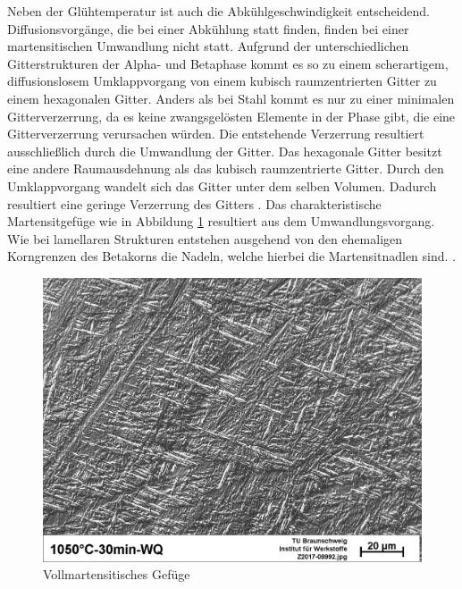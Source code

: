 \documentclass[a4paper, 11pt]{tubsreprt}
\begin{document}
Neben der Glühtemperatur ist auch die Abkühlgeschwindigkeit entscheidend. Diffusionsvorgänge, die bei einer Abkühlung statt finden, finden bei einer martensitischen Umwandlung nicht statt. Aufgrund der unterschiedlichen Gitterstrukturen der Alpha- und Betaphase kommt es so zu einem scherartigem, diffusionslosem Umklappvorgang von einem kubisch raumzentrierten Gitter zu einem hexagonalen Gitter. Anders als bei Stahl kommt es nur zu einer minimalen Gitterverzerrung, da es keine zwangsgelösten Elemente in der Phase gibt, die eine Gitterverzerrung verursachen würden. Die entstehende Verzerrung resultiert ausschließlich durch die Umwandlung der Gitter. Das hexagonale Gitter besitzt eine andere Raumausdehnung als das kubisch raumzentrierte Gitter. Durch den Umklappvorgang wandelt sich das Gitter unter dem selben Volumen. Dadurch resultiert eine geringe Verzerrung des Gitters \cite{Luetjering2007}. Das charakteristische Martensitgefüge wie in Abbildung \ref{vollmartensit} resultiert aus dem Umwandlungsvorgang. Wie bei lamellaren Strukturen entstehen ausgehend von den ehemaligen Korngrenzen des Betakorns die Nadeln, welche hierbei die Martensitnadlen sind. \cite{Luetjering2007}.

\begin{figure}
\centering
\includegraphics[scale=0.5]{Bilder/Vollmartensit.jpg}
\caption{Vollmartensitisches Gefüge}
\label{vollmartensit}
\end{figure}
\end{document}
